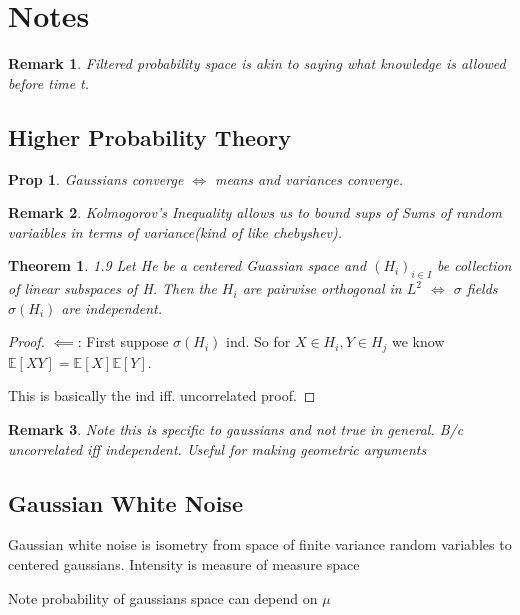 \documentclass[11pt]{article}
\newcommand{\E}{\mathbb{E}}
\newtheorem{prop}{Prop}
\newtheorem{remark}{Remark}
\newtheorem{theorem}{Theorem}
\begin{document}
\section{Notes}

\begin{remark}
	Filtered probability space is akin to saying what knowledge is allowed before time t.
\end{remark}

\subsection{Higher Probability Theory}

\begin{prop}
	Gaussians converge $\iff$ means and variances converge.
\end{prop}

\begin{remark}
	Kolmogorov's Inequality allows us to bound sups of Sums of random variaibles in terms of variance(kind of like chebyshev).
\end{remark}


\begin{theorem}1.9
	Let He be a centered Guassian space and $(H_i)_{i \in I}$ be collection of linear subspaces of H. Then the $H_i$ are pairwise orthogonal in $L^2$ $\iff$ $\sigma$ fields $\sigma(H_i)$ are independent.
\end{theorem}

\begin{proof}
	$\impliedby$: First suppose $\sigma(H_i)$ ind. So for $X \in H_i, Y \in H_j$ we know $\E[XY] = \E[X]\E[Y]$. 

	This is basically the ind iff. uncorrelated proof. 
\end{proof}

\begin{remark}
	Note this is specific to gaussians and not true in general. B/c uncorrelated iff independent. Useful for making geometric arguments
\end{remark}

\subsection{Gaussian White Noise}

Gaussian white noise is isometry from space of finite variance random variables to centered gaussians. Intensity is measure of measure space

Note probability of gaussians space can depend on $\mu$
\end{document}
